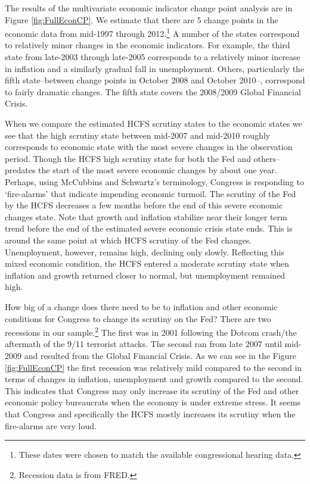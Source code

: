 \documentclass[a4paper]{article}\usepackage[]{graphicx}\usepackage[]{color}
\begin{document}
The results of the multivariate economic indicator change point analysis are in Figure \ref{fig:FullEconCP}. We estimate that there are 5 change points in the economic data from mid-1997 through 2012.\footnote{These dates were chosen to match the available congressional hearing data.} A number of the states correspond to relatively minor changes in the economic indicators. For example, the third state from late-2003 through late-2005 corresponds to a relatively minor increase in inflation and a similarly gradual fall in unemployment. Others, particularly the fifth state--between change points in October 2008 and October 2010--, correspond to fairly dramatic changes. The fifth state covers the 2008/2009 Global Financial Crisis. 

When we compare the estimated HCFS scrutiny states to the economic states we see that the high scrutiny state between mid-2007 and mid-2010 roughly corresponds to economic state with the most severe changes in the observation period. Though the HCFS high scrutiny state for both the Fed and others--predates the start of the most severe economic changes by about one year. Perhaps, using McCubbins and Schwartz's \citeyearpar{Mccubbins1984} terminology, Congress is responding to `fire-alarms' that indicate impending economic turmoil. The scrutiny of the Fed by the HCFS decreases a few months before the end of this severe economic changes state. Note that growth and inflation stabilize near their longer term trend before the end of the estimated severe economic crisis state ends. This is around the same point at which HCFS scrutiny of the Fed changes. Unemployment, however, remains high, declining only slowly. Reflecting this mixed economic condition, the HCFS entered a moderate scrutiny state when inflation and growth returned closer to normal, but unemployment remained high.     

How big of a change does there need to be to inflation and other economic conditions for Congress to change its scrutiny on the Fed? There are two recessions in our sample.\footnote{Recession data is from FRED.} The first was in 2001 following the Dotcom crash/the aftermath of the 9/11 terrorist attacks. The second ran from late 2007 until mid-2009 and resulted from the Global Financial Crisis. As we can see in the Figure \ref{fig:FullEconCP} the first recession was relatively mild compared to the second in terms of changes in inflation, unemployment and growth compared to the second. This indicates that Congress may only increase its scrutiny of the Fed and other economic policy bureaucrats when the economy is under extreme stress. It seems that Congress and specifically the HCFS mostly increases its scrutiny when the fire-alarms are very loud.
\end{document}
